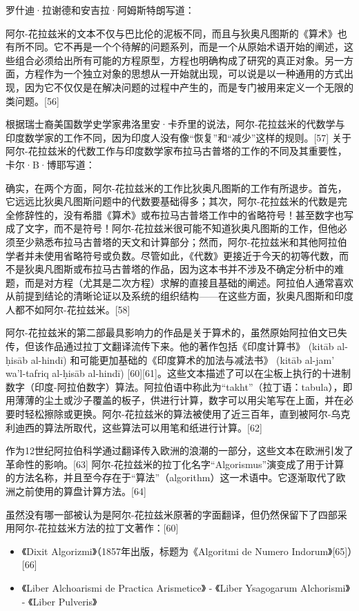 罗什迪·拉谢德和安吉拉·阿姆斯特朗写道：

阿尔-花拉兹米的文本不仅与巴比伦的泥板不同，而且与狄奥凡图斯的《算术》也有所不同。它不再是一个个待解的问题系列，而是一个从原始术语开始的阐述，这些组合必须给出所有可能的方程原型，方程也明确构成了研究的真正对象。另一方面，方程作为一个独立对象的思想从一开始就出现，可以说是以一种通用的方式出现，因为它不仅仅是在解决问题的过程中产生的，而是专门被用来定义一个无限的类问题。[56]

根据瑞士裔美国数学史学家弗洛里安·卡乔里的说法，阿尔-花拉兹米的代数学与印度数学家的工作不同，因为印度人没有像“恢复”和“减少”这样的规则。[57] 关于阿尔-花拉兹米的代数工作与印度数学家布拉马古普塔的工作的不同及其重要性，卡尔·B·博耶写道：

确实，在两个方面，阿尔-花拉兹米的工作比狄奥凡图斯的工作有所退步。首先，它远远比狄奥凡图斯问题中的代数要基础得多；其次，阿尔-花拉兹米的代数是完全修辞性的，没有希腊《算术》或布拉马古普塔工作中的省略符号！甚至数字也写成了文字，而不是符号！阿尔-花拉兹米很可能不知道狄奥凡图斯的工作，但他必须至少熟悉布拉马古普塔的天文和计算部分；然而，阿尔-花拉兹米和其他阿拉伯学者并未使用省略符号或负数。尽管如此，《代数》更接近于今天的初等代数，而不是狄奥凡图斯或布拉马古普塔的作品，因为这本书并不涉及不确定分析中的难题，而是对方程（尤其是二次方程）求解的直接且基础的阐述。阿拉伯人通常喜欢从前提到结论的清晰论证以及系统的组织结构——在这些方面，狄奥凡图斯和印度人都不如阿尔-花拉兹米。[58]


阿尔-花拉兹米的第二部最具影响力的作品是关于算术的，虽然原始阿拉伯文已失传，但该作品通过拉丁文翻译流传下来。他的著作包括《印度计算书》 (kitāb al-ḥisāb al-hindī) 和可能更加基础的《印度算术的加法与减法书》 (kitāb al-jam' wa'l-tafriq al-ḥisāb al-hindī) [60][61]。这些文本描述了可以在尘板上执行的十进制数字（印度-阿拉伯数字）算法。阿拉伯语中称此为“takht”（拉丁语：tabula），即用薄薄的尘土或沙子覆盖的板子，供进行计算，数字可以用尖笔写在上面，并在必要时轻松擦除或更换。阿尔-花拉兹米的算法被使用了近三百年，直到被阿尔-乌克利迪西的算法所取代，这些算法可以用笔和纸进行计算。[62]

作为12世纪阿拉伯科学通过翻译传入欧洲的浪潮的一部分，这些文本在欧洲引发了革命性的影响。[63] 阿尔-花拉兹米的拉丁化名字“Algorismus”演变成了用于计算的方法名称，并且至今存在于“算法”（algorithm）这一术语中。它逐渐取代了欧洲之前使用的算盘计算方法。[64]

虽然没有哪一部被认为是阿尔-花拉兹米原著的字面翻译，但仍然保留下了四部采用阿尔-花拉兹米方法的拉丁文著作：[60]

\begin{itemize}
\item 《Dixit Algorizmi》（1857年出版，标题为《Algoritmi de Numero Indorum》[65]）[66]
\item 《Liber Alchoarismi de Practica Arismetice》
- 《Liber Ysagogarum Alchorismi》
- 《Liber Pulveris》
\end{itemize}

